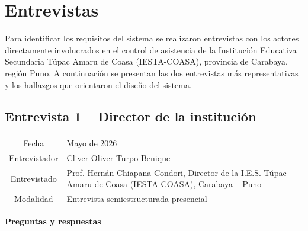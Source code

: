 \documentclass[a4paper,12pt]{article}
\begin{document}
\section{Entrevistas}

Para identificar los requisitos del sistema se realizaron entrevistas con los
actores directamente involucrados en el control de asistencia de la
Institución Educativa Secundaria Túpac Amaru de Coasa (IESTA-COASA), provincia
de Carabaya, región Puno. A continuación se presentan las dos entrevistas más
representativas y los hallazgos que orientaron el diseño del sistema.

\subsection{Entrevista 1 -- Director de la institución}

\noindent
\begin{tabularx}{\linewidth}{C X}
\toprule
Fecha          & Mayo de 2026 \\
Entrevistador  & Cliver Oliver Turpo Benique \\
Entrevistado   & Prof. Hernán Chiapana Condori, Director de la I.E.S. Túpac Amaru de Coasa (IESTA-COASA), Carabaya -- Puno \\
Modalidad      & Entrevista semiestructurada presencial \\
\bottomrule
\end{tabularx}

\vspace{0.4cm}
\noindent\textbf{Preguntas y respuestas}
\end{document}
